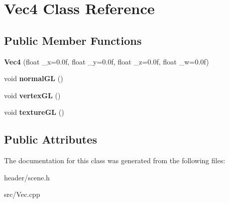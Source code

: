\hypertarget{classVec4}{
\section{Vec4 Class Reference}
\label{classVec4}
}
\subsection*{Public Member Functions}
\begin{DoxyCompactItemize}
\item 
\hypertarget{classVec4_ad7b6f18b11bfd0ba577f3ba31cafb0ea}{
{\bfseries Vec4} (float \_\-x=0.0f, float \_\-y=0.0f, float \_\-z=0.0f, float \_\-w=0.0f)}
\label{classVec4_ad7b6f18b11bfd0ba577f3ba31cafb0ea}

\item 
\hypertarget{classVec4_acee53a901d28f815b1f7d46d8edf331c}{
void {\bfseries normalGL} ()}
\label{classVec4_acee53a901d28f815b1f7d46d8edf331c}

\item 
\hypertarget{classVec4_ae480876e60e8e09b9d5d5670adfeab30}{
void {\bfseries vertexGL} ()}
\label{classVec4_ae480876e60e8e09b9d5d5670adfeab30}

\item 
\hypertarget{classVec4_aacc7438ff8782f424b49819f4205d27d}{
void {\bfseries textureGL} ()}
\label{classVec4_aacc7438ff8782f424b49819f4205d27d}

\end{DoxyCompactItemize}
\subsection*{Public Attributes}


The documentation for this class was generated from the following files:\begin{DoxyCompactItemize}
\item 
header/scene.h\item 
src/Vec.cpp\end{DoxyCompactItemize}
